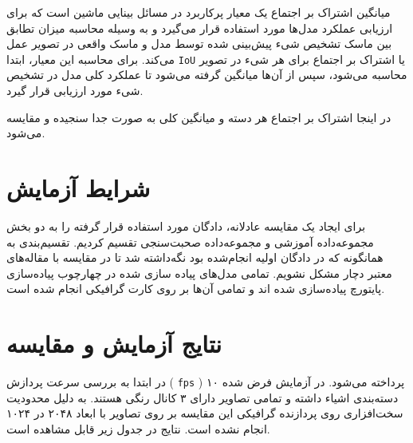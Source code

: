 میانگین اشتراک بر اجتماع
یک معیار پرکاربرد در مسائل بینایی ماشین
است که برای ارزیابی عملکرد مدل‌ها مورد استفاده قرار می‌گیرد و به وسیله محاسبه میزان تطابق بین ماسک تشخیص
شیء پیش‌بینی شده توسط مدل و ماسک واقعی در تصویر عمل می‌کند. برای محاسبه این معیار، ابتدا
\verb*|IoU|
یا اشتراک بر اجتماع برای هر شیء در تصویر محاسبه می‌شود، سپس از آن‌ها میانگین گرفته می‌شود تا عملکرد کلی مدل در تشخیص شیء مورد ارزیابی قرار گیرد.

در اینجا اشتراک بر اجتماع هر دسته و میانگین کلی به صورت جدا سنجیده و مقایسه می‌شود.

\section{شرایط آزمایش}

برای ایجاد یک مقایسه عادلانه، دادگان مورد استفاده قرار گرفته را به دو بخش مجموعه‌داده آموزشی
و مجموعه‌داده صحبت‌سنجی
تقسیم کردیم. تقسیم‌بندی به همانگونه که در دادگان اولیه انجام‌شده بود نگه‌داشته شد تا در مقایسه با مقاله‌های معتبر دچار مشکل نشویم.
تمامی مدل‌های پیاده سازی شده در چهارچوب پیاده‌سازی پایتورچ
پیاده‌سازی شده اند و تمامی آن‌ها بر روی کارت گرافیکی
انجام شده است.
\section{نتایج آزمایش و مقایسه}

در ابتدا به بررسی سرعت پردازش (
\verb*|fps|
) پرداخته می‌شود. در آزمایش فرض شده ۱۰ دسته‌بندی اشیاء داشته و تمامی تصاویر دارای ۳ کانال رنگی هستند. به دلیل محدودیت سخت‌افزاری روی پردازنده گرافیکی این مقایسه بر روی تصاویر با ابعاد ۲۰۴۸ در ۱۰۲۴ انجام نشده است. نتایج در جدول زیر قابل مشاهده است.

